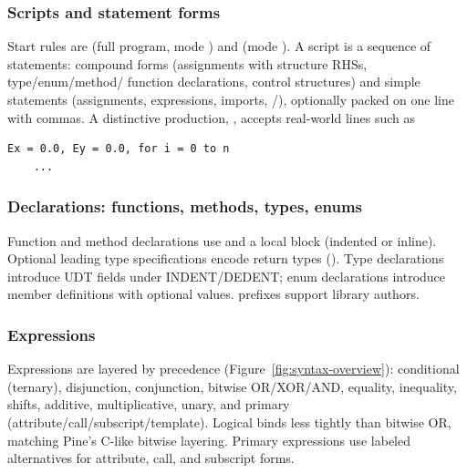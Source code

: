 \documentclass[11pt,a4paper]{article}
\begin{document}
\subsubsection{Scripts and statement forms}
Start rules are  (full program, mode ) and
 (mode ). A script is a sequence of
statements: compound forms (assignments with structure RHSs, type/enum/method/
function declarations, control structures) and simple statements (assignments,
expressions, imports, /), optionally packed on one
line with commas. A distinctive production,
, accepts real-world lines such as
\begin{lstlisting}[style=pine,numbers=none]
Ex = 0.0, Ey = 0.0, for i = 0 to n
    ...
\end{lstlisting}

\subsubsection{Declarations: functions, methods, types, enums}
Function and method declarations use \code{=>} and a local block (indented or
inline). Optional leading type specifications encode return types
(). Type declarations introduce UDT fields under
INDENT/DEDENT; enum declarations introduce member definitions with optional
values.  prefixes support library authors.

\subsubsection{Expressions}
Expressions are layered by precedence (Figure~\ref{fig:syntax-overview}):
conditional (ternary), disjunction, conjunction, bitwise OR/XOR/AND, equality,
inequality, shifts, additive, multiplicative, unary, and primary
(attribute/call/subscript/template). Logical  binds less tightly than
bitwise OR, matching Pine's C-like bitwise layering. Primary expressions use
labeled alternatives for attribute, call, and subscript forms.
\end{document}
